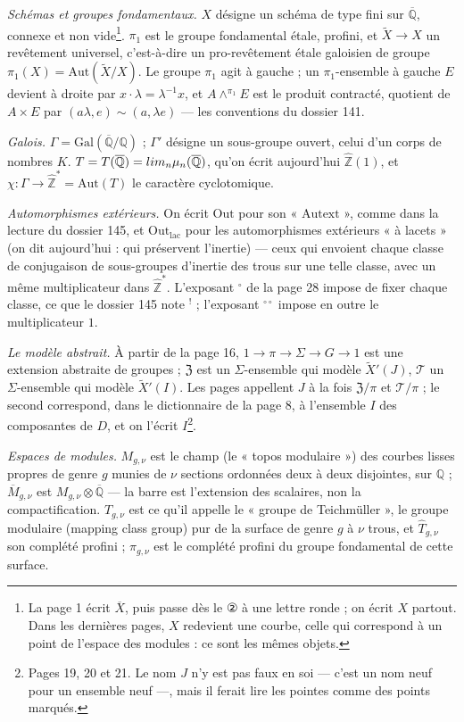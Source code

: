 \documentclass[11pt,a4paper]{article}
\begin{document}
\emph{Schémas et groupes fondamentaux.} $X$ désigne un schéma de type fini sur
$\overline{\mathbb{Q}}$, connexe et non vide\footnote{La page 1 écrit
$\overline{X}$, puis passe dès le ② à une lettre ronde ; on écrit $X$ partout.
Dans les dernières pages, $X$ redevient une courbe, celle qui correspond à un
point de l'espace des modules : ce sont les mêmes objets.}. $\pi_1$ est le
groupe fondamental étale, profini, et $\widetilde X \to X$ un revêtement
universel, c'est-à-dire un pro-revêtement étale galoisien de groupe
$\pi_1(X) = \mathrm{Aut}(\widetilde X/X)$. Le groupe $\pi_1$ agit à gauche ; un
$\pi_1$-ensemble à gauche $E$ devient à droite par $x\cdot\lambda =
\lambda^{-1}x$, et $A \wedge^{\pi_1} E$ est le produit contracté, quotient de
$A \times E$ par $(a\lambda, e) \sim (a, \lambda e)$ — les conventions du
dossier 141.

\emph{Galois.} $\Gamma = \mathrm{Gal}(\overline{\mathbb{Q}}/\mathbb{Q})$ ;
$\Gamma'$ désigne un sous-groupe ouvert, celui d'un corps de nombres $K$.
$T = T(\overline{\mathbb{Q}}) = \varprojlim_n \mu_n(\overline{\mathbb{Q}})$, qu'on
écrit aujourd'hui $\widehat{\mathbb{Z}}(1)$, et $\chi : \Gamma \to
\widehat{\mathbb{Z}}^{*} = \mathrm{Aut}(T)$ le caractère cyclotomique.

\emph{Automorphismes extérieurs.} On écrit $\mathrm{Out}$ pour son
« $\mathrm{Autext}$ », comme dans la lecture du dossier 145, et
$\mathrm{Out}_{\mathrm{lac}}$ pour les automorphismes extérieurs « à lacets »
(on dit aujourd'hui : qui préservent l'inertie) — ceux qui envoient chaque
classe de conjugaison de sous-groupes d'inertie des trous sur une telle
classe, avec un même multiplicateur dans $\widehat{\mathbb{Z}}^{*}$.
L'exposant ${}^{\circ}$ de la page 28 impose de fixer chaque classe, ce que le
dossier 145 note ${}^{!}$ ; l'exposant ${}^{\circ\circ}$ impose en outre le
multiplicateur $1$.

\emph{Le modèle abstrait.} À partir de la page 16, $1 \to \pi \to \Sigma \to
G \to 1$ est une extension abstraite de groupes ; $\mathfrak{Z}$ est un
$\Sigma$-ensemble qui modèle $\widetilde X'(J)$, $\mathcal{T}$ un
$\Sigma$-ensemble qui modèle $\widetilde X'(I)$. Les pages appellent $J$ à la
fois $\mathfrak{Z}/\pi$ et $\mathcal{T}/\pi$ ; le second correspond, dans le
dictionnaire de la page 8, à l'ensemble $I$ des composantes de $D$, et on
l'écrit $I$\footnote{Pages 19, 20 et 21. Le nom $J$ n'y est pas faux en
soi — c'est un nom neuf pour un ensemble neuf —, mais il ferait lire les
pointes comme des points marqués.}.

\emph{Espaces de modules.} $M_{g,\nu}$ est le champ (le « topos modulaire »)
des courbes lisses propres de genre $g$ munies de $\nu$ sections ordonnées
deux à deux disjointes, sur $\mathbb{Q}$ ; $\overline{M}_{g,\nu}$ est
$M_{g,\nu} \otimes \overline{\mathbb{Q}}$ — la barre est l'extension des
scalaires, non la compactification. $T_{g,\nu}$ est ce qu'il appelle le
« groupe de Teichmüller », le groupe modulaire (mapping class group) pur de la
surface de genre $g$ à $\nu$ trous, et $\widehat T_{g,\nu}$ son complété
profini ; $\widehat\pi_{g,\nu}$ est le complété profini du groupe fondamental
de cette surface.
\end{document}
